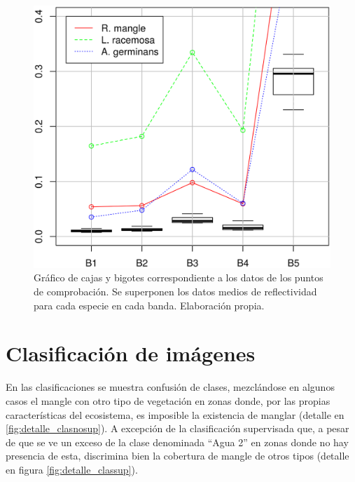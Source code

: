 \begin{figure}
	\centering
	\includegraphics[width=0.8\linewidth]{./Imagenes/grafica_comprob.eps}
	\caption[Gráfico de puntos de comprobación]{Gráfico de cajas y bigotes correspondiente a los datos de los puntos de comprobación. Se superponen los datos medios de reflectividad para cada especie en cada banda. Elaboración propia.}
	\label{fig:grafica_comprob}
\end{figure}


\section{Clasificación de imágenes}
En las clasificaciones se muestra confusión de clases, mezclándose en algunos casos el mangle con otro tipo de vegetación en zonas donde, por las propias características del ecosistema, es imposible la existencia de manglar (detalle en \ref{fig:detalle_clasnosup}). A excepción de la clasificación supervisada que, a pesar de que se ve un exceso de la clase denominada ``Agua 2'' en zonas donde no hay presencia de esta, discrimina bien la cobertura de mangle de otros tipos (detalle en figura \ref{fig:detalle_classup}).%


